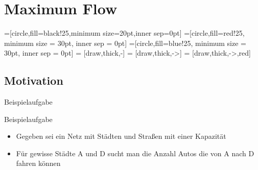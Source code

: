 \section{Maximum Flow}
  =[circle,fill=black!25,minimum size=20pt,inner sep=0pt]
  =[circle,fill=red!25, minimum size = 30pt, inner sep = 0pt]
  =[circle,fill=blue!25, minimum size = 30pt, inner sep = 0pt]
   = [draw,thick,-]
   = [draw,thick,->]
   = [draw,thick,->,red]

  \subsection{Motivation}
  \begin{frame}{Beispielaufgabe}
    \begin{block}{Beispielaufgabe}
      \begin{itemize}
        \item Gegeben sei ein Netz mit Städten und Straßen mit einer Kapazität
        \pause
        \item Für gewisse Städte A und D sucht man die Anzahl Autos die von A nach D fahren können
      \end{itemize}
    \end{block}
  \end{frame}

